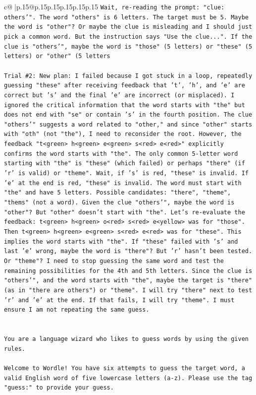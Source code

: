 \documentclass{article}
\begin{document}
{\begin{supertabular}{c@{$\;$}|p{.15\linewidth}@{}p{.15\linewidth}p{.15\linewidth}p{.15\linewidth}p{.15\linewidth}p{.15\linewidth}}
{{{\texttt{Wait, re{-}reading the prompt: "clue: others'". The word "others" is 6 letters. The target must be 5. Maybe the word is "other"? Or maybe the clue is misleading and I should just pick a common word. But the instruction says "Use the clue...". If the clue is "others'", maybe the word is "those" (5 letters) or "these" (5 letters) or "other" (5 letters} \\
\\ 
\texttt{Trial \#2: New plan: I failed because I got stuck in a loop, repeatedly guessing "these" after receiving feedback that 't', 'h', and 'e' are correct but 's' and the final 'e' are incorrect (or misplaced). I ignored the critical information that the word starts with "the" but does not end with "se" or contain 's' in the fourth position. The clue "others'" suggests a word related to "other," and since "other" starts with "oth" (not "the"), I need to reconsider the root. However, the feedback "t<green> h<green> e<green> s<red> e<red>" explicitly confirms the word starts with "the". The only common 5{-}letter word starting with "the" is "these" (which failed) or perhaps "there" (if 'r' is valid) or "theme". Wait, if 's' is red, "these" is invalid. If 'e' at the end is red, "these" is invalid. The word must start with "the" and have 5 letters. Possible candidates: "there", "theme", "thems" (not a word). Given the clue "others'", maybe the word is "other"? But "other" doesn't start with "the". Let's re{-}evaluate the feedback: t<green> h<green> o<red> s<red> e<yellow> was for "those". Then t<green> h<green> e<green> s<red> e<red> was for "these". This implies the word starts with "the". If "these" failed with 's' and last 'e' wrong, maybe the word is "there"? But 'r' hasn't been tested. Or "theme"? I need to stop guessing the same word and test the remaining possibilities for the 4th and 5th letters. Since the clue is "others'", and the word starts with "the", maybe the target is "there" (as in "there are others") or "theme". I will try "there" next to test 'r' and 'e' at the end. If that fails, I will try "theme". I must ensure I am not repeating the same guess.} \\
\\ 
\\ 
\texttt{You are a language wizard who likes to guess words by using the given rules.} \\
\\ 
\texttt{Welcome to Wordle! You have six attempts to guess the target word, a valid English word of five lowercase letters (a{-}z). Please use the tag "guess:" to provide your guess.} \\
}}}
\end{supertabular}}
\end{document}
